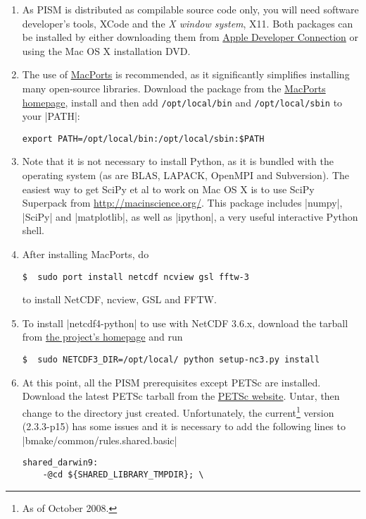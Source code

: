 \documentclass[11pt,final]{amsart}
\begin{document}
\begin{enumerate}
\item As PISM is distributed as compilable source code only, you will need software developer's tools, XCode and the \emph{X
    window system}, X11. Both packages can be installed by either downloading them from
  \href{http://developer.apple.com/tools/xcode/}{Apple Developer Connection} or using the Mac OS X installation DVD.
\item The use of \href{http://www.macports.org/}{MacPorts} is recommended, as it significantly simplifies installing many
  open-source libraries. Download the package from the \href{http://www.macports.org/install.php}{MacPorts homepage}, install and
  then add \verb|/opt/local/bin| and \verb|/opt/local/sbin| to your |PATH|:
\begin{verbatim}
export PATH=/opt/local/bin:/opt/local/sbin:$PATH
\end{verbatim}
\item Note that it is not necessary to install Python, as it is bundled with the operating system (as are BLAS, LAPACK, OpenMPI and
  Subversion). The easiest way to get SciPy et al to work on Mac OS X is to use SciPy Superpack from
  \url{http://macinscience.org/}. This package includes |numpy|, |SciPy| and |matplotlib|, as well as |ipython|, a very useful
  interactive Python shell.
\item After installing MacPorts, do
\begin{verbatim}
$  sudo port install netcdf ncview gsl fftw-3
\end{verbatim}
to install NetCDF, ncview, GSL and FFTW.
\item To install |netcdf4-python| to use with NetCDF 3.6.x, download the tarball from \href{http://code.google.com/p/netcdf4-python/}{the project's homepage} and run
\begin{verbatim}
$  sudo NETCDF3_DIR=/opt/local/ python setup-nc3.py install
\end{verbatim}
\item At this point, all the PISM prerequisites except PETSc are installed. Download the latest PETSc tarball from the
  \href{ftp://ftp.mcs.anl.gov/pub/petsc/release-snapshots/}{PETSc website}. Untar, then change to the directory just created.
  Unfortunately, the current\footnote{As of October 2008.} version (2.3.3-p15) has some issues and it is necessary to add the following lines to
  |bmake/common/rules.shared.basic| {\scriptsize
\begin{verbatim}
shared_darwin9:
	-@cd ${SHARED_LIBRARY_TMPDIR}; \

\end{verbatim}}
\end{enumerate}
\end{document}
